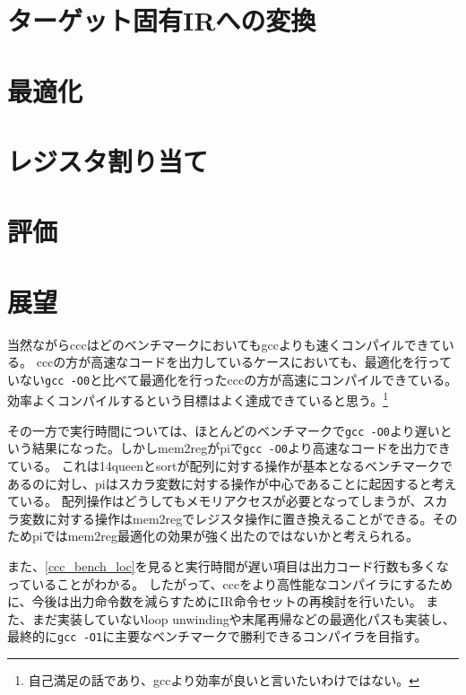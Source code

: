 \documentclass[uplatex,a4paper]{jsarticle}
\begin{document}
\clearpage
\section{ターゲット固有IRへの変換}
\label{archconv}


\clearpage
\section{最適化}
\label{optimization}


\clearpage
\section{レジスタ割り当て}
\label{ccc_regalloc}


\clearpage
\section{評価}
\label{ccc_performance}


\section{展望}

当然ながらcccはどのベンチマークにおいてもgccよりも速くコンパイルできている。
cccの方が高速なコードを出力しているケースにおいても、最適化を行っていない\texttt{gcc -O0}と比べて最適化を行ったcccの方が高速にコンパイルできている。
効率よくコンパイルするという目標はよく達成できていると思う。\footnote{自己満足の話であり、gccより効率が良いと言いたいわけではない。}

その一方で実行時間については、ほとんどのベンチマークで\texttt{gcc -O0}より遅いという結果になった。しかしmem2regがpiで\texttt{gcc -O0}より高速なコードを出力できている。
これは14queenとsortが配列に対する操作が基本となるベンチマークであるのに対し、piはスカラ変数に対する操作が中心であることに起因すると考えている。
配列操作はどうしてもメモリアクセスが必要となってしまうが、スカラ変数に対する操作はmem2regでレジスタ操作に置き換えることができる。そのためpiではmem2reg最適化の効果が強く出たのではないかと考えられる。

また、\cref{ccc_bench_loc}を見ると実行時間が遅い項目は出力コード行数も多くなっていることがわかる。
したがって、cccをより高性能なコンパイラにするために、今後は出力命令数を減らすためにIR命令セットの再検討を行いたい。
また、まだ実装していないloop unwindingや末尾再帰などの最適化パスも実装し、最終的に\texttt{gcc -O1}に主要なベンチマークで勝利できるコンパイラを目指す。
\end{document}
